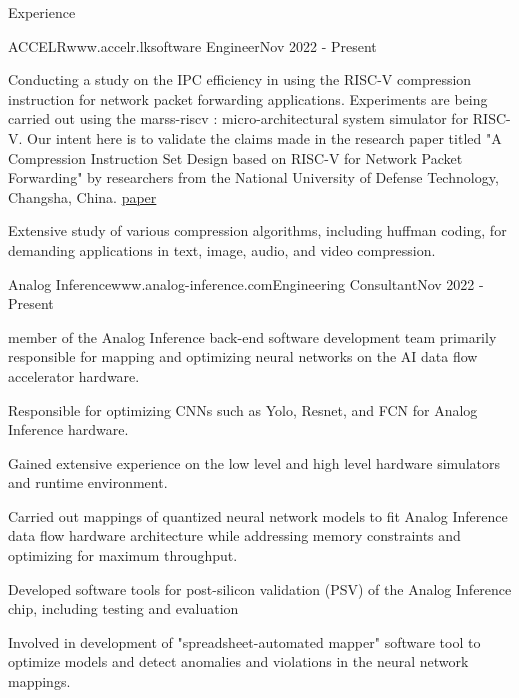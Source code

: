 \documentclass[
	11pt, %
]{./assets/resume} %
\begin{document}
\begin{rSection}{Experience}

	\begin{rSubsectionX}{ACCELR}{www.accelr.lk}{software Engineer}{Nov 2022 - Present}
		\item Conducting a study on the IPC efficiency in using the RISC-V compression instruction for network packet forwarding applications. Experiments are being carried out using the marss-riscv : micro-architectural system simulator for RISC-V. Our intent here is to validate the claims made in the  research paper titled "A Compression Instruction Set Design based on RISC-V for Network Packet Forwarding" by researchers from the National University of Defense Technology, Changsha, China. \href{https://iopscience.iop.org/article/10.1088/1742-6596/1026/1/012001/pdf}{paper} 
		\item Extensive study of various compression algorithms, including huffman coding, for demanding applications in text, image, audio, and video compression.
	\end{rSubsectionX}

	\begin{rSubsectionX}{Analog Inference}{www.analog-inference.com}{Engineering Consultant}{Nov 2022 - Present}
		\item member of the Analog Inference back-end software development team primarily responsible for mapping and optimizing neural networks on the AI data flow accelerator hardware.
        \item Responsible for optimizing CNNs such as Yolo, Resnet, and FCN for Analog Inference hardware. 
        \item Gained extensive experience on the low level and high level hardware simulators and runtime environment.
        \item Carried out mappings of quantized neural network models to fit Analog Inference data flow hardware architecture while addressing memory constraints and optimizing for maximum throughput.
        \item Developed software tools for post-silicon validation (PSV) of the Analog Inference chip, including testing and evaluation
        \item Involved in development of "spreadsheet-automated mapper" software tool to optimize models and detect anomalies and violations in the neural network mappings.
	\end{rSubsectionX}

	\pagebreak


\end{rSection}
\end{document}

